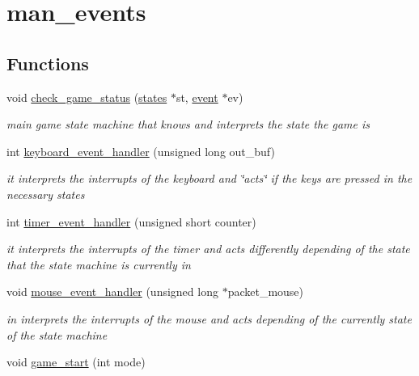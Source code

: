 \hypertarget{group__man__events}{}\section{man\+\_\+events}
\label{group__man__events}
\subsection*{Functions}
\begin{DoxyCompactItemize}
\item 
void \hyperlink{group__man__events_ga35641febfec789ab3ddc031482a80ea1}{check\+\_\+game\+\_\+status} (\hyperlink{group__man__events_gaa19be6305a5a4485e1e70de70ed7d677}{states} $\ast$st, \hyperlink{group__man__events_ga3b65133bb9997cd1ccf311af0927fc9e}{event} $\ast$ev)
\begin{DoxyCompactList}\small\item\em main game state machine that knows and interprets the state the game is \end{DoxyCompactList}\item 
int \hyperlink{group__man__events_ga87d21261b5adc5a0dccb151f938735a9}{keyboard\+\_\+event\+\_\+handler} (unsigned long out\+\_\+buf)
\begin{DoxyCompactList}\small\item\em it interprets the interrupts of the keyboard and \char`\"{}acts\char`\"{} if the keys are pressed in the necessary states \end{DoxyCompactList}\item 
int \hyperlink{group__man__events_ga5c998385f8d5e28e1380654ad355e0b5}{timer\+\_\+event\+\_\+handler} (unsigned short counter)
\begin{DoxyCompactList}\small\item\em it interprets the interrupts of the timer and acts differently depending of the state that the state machine is currently in \end{DoxyCompactList}\item 
void \hyperlink{group__man__events_ga9c2df329e13887f8f241315c35057d77}{mouse\+\_\+event\+\_\+handler} (unsigned long $\ast$packet\+\_\+mouse)
\begin{DoxyCompactList}\small\item\em in interprets the interrupts of the mouse and acts depending of the currently state of the state machine \end{DoxyCompactList}\item 
void \hyperlink{group__man__events_ga07dc5293a915fb3c924067ef41f08d23}{game\+\_\+start} (int mode)

\end{DoxyCompactItemize}

